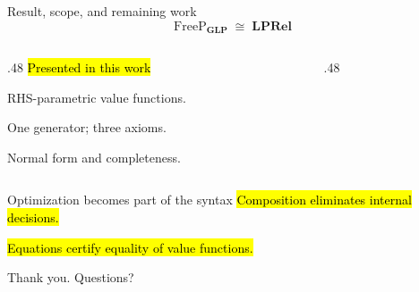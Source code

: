 \documentclass[aspectratio=169,12pt]{beamer}
\newcommand{\GLP}{\mathbf{GLP}}
\newcommand{\LPRel}{\mathbf{LPRel}}
\begin{document}
\begin{frame}[t]{Result, scope, and remaining work}
\[
\mathrm{FreeP}_{\GLP}\;\cong\;\LPRel
\]
\begin{columns}[T,onlytextwidth]
\begin{column}{.48\textwidth}
\hl{Presented in this work}\par
\vspace{3mm}
{\small RHS-parametric value functions.\par
\vspace{1mm}
One generator; three axioms.\par
\vspace{1mm}
Normal form and completeness.}
\end{column}
\begin{column}{.48\textwidth}
\end{column}
\end{columns}
\end{frame}

\begin{frame}[t]{Optimization becomes part of the syntax}
\hl{Composition eliminates internal decisions.}\par
\vspace{5mm}
\hl{Equations certify equality of value functions.}\par
\vspace{5mm}
\large{Thank you. Questions?}
\end{frame}
\end{document}
